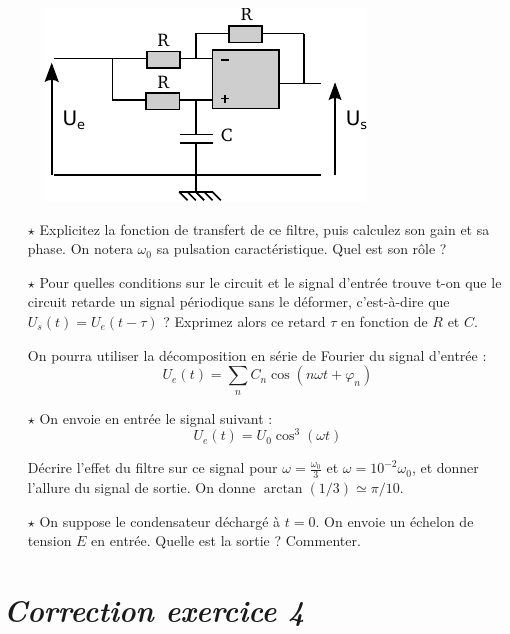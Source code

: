 \documentclass{report}
\begin{document}
\begin{figure}[!h]
\centering
\includegraphics[width=0.5\linewidth]{circuit_.pdf}
\end{figure}

\begin{itemize}
\item[$\star$] Explicitez la fonction de transfert de ce filtre, puis calculez son gain et sa phase. On notera $\omega_0$ sa pulsation caractéristique. Quel est son rôle ?

\item[$\star$]
Pour quelles conditions sur le circuit et le signal d'entrée trouve t-on que le circuit retarde un signal périodique sans le déformer, c'est-à-dire que $U_{s}(t)=U_{e}(t-\tau)$ ? Exprimez alors ce retard $\tau$ en fonction de $R$ et $C$.

On pourra utiliser la décomposition en série de Fourier du signal d'entrée :
\begin{equation}
U_e(t) = \sum_n C_n\cos(n\omega t + \varphi_n)
\end{equation}

\item[$\star$] On envoie en entrée le signal suivant :
\begin{equation}
U_{e}(t) = U_{0}\cos^{3}(\omega t)
\end{equation}

Décrire l'effet du filtre sur ce signal pour $\omega = \frac{\omega_{0}}{3}$ et $\omega=10^{-2}\omega_0$, et donner l'allure du signal de sortie. On donne $\arctan(1/3)\simeq\pi/10$.

\item[$\star$]
On suppose le condensateur déchargé à $t=0$. On envoie un échelon de tension $E$ en entrée. Quelle est la sortie ? Commenter.
\end{itemize}

\newpage

\section*{\textit{Correction exercice 4}}
\end{document}
